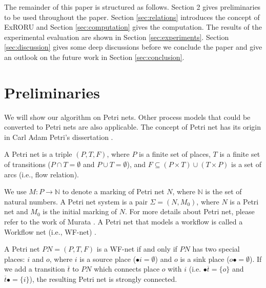 \documentclass{llncs}
\begin{document}
The remainder of this paper is structured as follows. Section 2 gives preliminaries to be used throughout the paper. Section \ref{sec:relations} introduces the concept of ExRORU and Section \ref{sec:computation} gives the computation. The results of the experimental evaluation are shown in Section \ref{sec:experiments}. Section \ref{sec:discussion} gives some deep discussions before we conclude the paper and give an outlook on the future work in Section \ref{sec:conclusion}.

\section{Preliminaries}\label{sec:preliminaries}
We will show our algorithm on Petri nets. Other process models that could be converted to Petri nets are also applicable. The concept of Petri net has its origin in Carl Adam Petri's dissertation \cite{petri1966kommunikation}.

\begin{definition}\label{def:petrinet}
A Petri net is a triple $(P,T,F)$, where $P$ is a finite set of places, $T$ is a finite set of transitions ($P\cap T=\emptyset$ and $P\cup T=\emptyset$), and $F\subseteq(P\times T)\cup(T\times P)$ is a set of arcs (i.e., flow relation).
\end{definition}

We use $M:P\rightarrow\mathbb{N}$ to denote a marking of Petri net $N$, where $\mathbb{N}$ is the set of natural numbers. A Petri net system is a pair $\Sigma=(N,M_{0})$, where $N$ is a Petri net and $M_{0}$ is the initial marking of $N$. For more details about Petri net, please refer to the work of Murata \cite{murata1989petri}. A Petri net that models a workflow is called a Workflow net (i.e., WF-net) \cite{van1998application}.

\begin{definition}[WF-net]\label{def:wfnet}
A Petri net $PN=(P,T,F)$ is a WF-net if and only if $PN$ has two special places: $i$ and $o$, where $i$ is a source place ($\bullet i=\emptyset$) and $o$ is a sink place ($o\bullet =\emptyset$). If we add a transition $\overline{t}$ to $PN$ which connects place $o$ with $i$ (i.e. $\bullet \overline{t}=\{o\}$ and $\overline{t}\bullet=\{i\}$), the resulting Petri net is strongly connected.
\end{definition}
\end{document}

